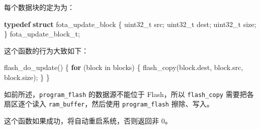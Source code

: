 \documentclass[
  12pt,
]{book}
\newenvironment{Shaded}{\begin{snugshade}}{\end{snugshade}}
\newcommand{\ControlFlowTok}[1]{\textcolor[rgb]{0.13,0.29,0.53}{\textbf{#1}}}
\newcommand{\DataTypeTok}[1]{\textcolor[rgb]{0.13,0.29,0.53}{#1}}
\newcommand{\KeywordTok}[1]{\textcolor[rgb]{0.13,0.29,0.53}{\textbf{#1}}}
\newcommand{\NormalTok}[1]{#1}
\begin{document}
每个数据块的定为为：

\begin{Shaded}
\begin{Highlighting}[]
\KeywordTok{typedef} \KeywordTok{struct}\NormalTok{ fota_update_block}
\NormalTok{\{}
    \DataTypeTok{uint32_t}\NormalTok{ src;}
    \DataTypeTok{uint32_t}\NormalTok{ dest;}
    \DataTypeTok{uint32_t}\NormalTok{ size;}
\NormalTok{\} fota_update_block_t;}
\end{Highlighting}
\end{Shaded}

这个函数的行为大致如下：

\begin{Shaded}
\begin{Highlighting}[]
\NormalTok{flash_do_update() \{}
    \ControlFlowTok{for}\NormalTok{ (block in blocks) \{}
\NormalTok{        flash_copy(block.dest,}
\NormalTok{                   block.src,}
\NormalTok{                   block.size);}
\NormalTok{    \}}
\NormalTok{\}}
\end{Highlighting}
\end{Shaded}

如前所述，\texttt{program\_flash} 的数据源不能位于 Flash，所以 \texttt{flash\_copy} 需要把各扇区逐个读入
\texttt{ram\_buffer}，然后使用 \texttt{program\_flash} 擦除、写入。

这个函数如果成功，将自动重启系统，否则返回非 0。

  

\backmatter
\printindex
\end{document}
